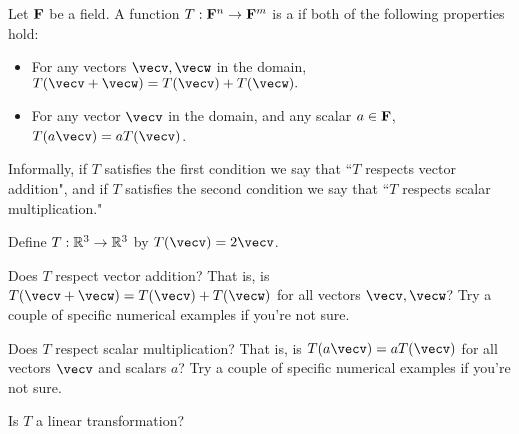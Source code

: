 


\endedxvertical











Let ${\bf {F}}$ be a field.  A function $T: {\bf {F}}^n \rightarrow {\bf {F}}^m$ is a {}
if both of the following properties hold:

\begin{itemize}
\item For any vectors $\vecv, \vecw$ in the domain, $T(\vecv + \vecw) = T(\vecv) + T(\vecw).$ 
\item For any vector $\vecv$ in the domain, and any scalar $a\in {\bf {F}}$, $T(a\vecv) = aT(\vecv)$.    
\end{itemize}

Informally, if $T$ satisfies the first condition we say that ``$T$ respects vector addition", and 
if $T$ satisfies the second condition we say that ``$T$ respects scalar multiplication."  

\endedxtext

\endedxvertical






Define $T: \mathbb R^3 \rightarrow \mathbb R^3$ by $T(\vecv) = 2\vecv$.  

Does $T$ respect vector addition?  That is, is $T(\vecv + \vecw) = T(\vecv) + T(\vecw)$ for all 
vectors $\vecv,\vecw$?
Try a couple of specific numerical examples if you're not sure.  


Does $T$ respect scalar multiplication?  
That is, is $T(a\vecv) = aT(\vecv)$ for all vectors $\vecv$ and scalars $a$?
Try a couple of specific numerical examples if you're not sure.  



Is $T$ a linear transformation?

